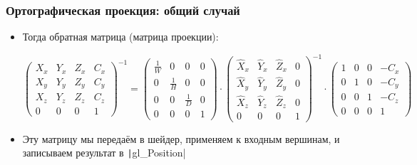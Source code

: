 \documentclass[10pt]{beamer}
\begin{document}
\begin{frame}[fragile]
\frametitle{Ортографическая проекция: общий случай}
\begin{itemize}
\item Тогда обратная матрица (матрица проекции):
\begin{center}
\begin{math}
\begin{pmatrix}
X_x & Y_x & Z_x & C_x \\
X_y & Y_y & Z_y & C_y \\
X_z & Y_z & Z_z & C_z \\
0 & 0 & 0 & 1
\end{pmatrix}^{-1}
=
\begin{pmatrix}
\frac{1}{W} & 0 & 0 & 0 \\
0 & \frac{1}{H} & 0 & 0 \\
0 & 0 & \frac{1}{D} & 0 \\
0 & 0 & 0 & 1
\end{pmatrix}
\cdot
\begin{pmatrix}
\hat X_x & \hat Y_x & \hat Z_x & 0 \\
\hat X_y & \hat Y_y & \hat Z_y & 0 \\
\hat X_z & \hat Y_z & \hat Z_z & 0 \\
0 & 0 & 0 & 1
\end{pmatrix}^{-1}
\cdot
\begin{pmatrix}
1 & 0 & 0 & -C_x \\
0 & 1 & 0 & -C_y \\
0 & 0 & 1 & -C_z \\
0 & 0 & 0 & 1
\end{pmatrix}
\end{math}
\end{center}
\pause
\item Эту матрицу мы передаём в шейдер, применяем к входным вершинам, и записываем результат в \texttt|gl_Position|
\end{itemize}
\end{frame}
\end{document}
